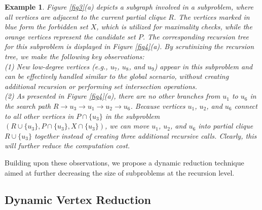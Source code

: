 \documentclass[sigconf, nonacm]{acmart}
\newtheorem{exmp}{Example}%
\begin{document}
\begin{exmp}
    \textit{
   Figure \ref{fig3}(a) depicts a subgraph involved in a subproblem, where all vertices are adjacent to the current partial clique $R$. The vertices marked in blue form the forbidden set $X$, which is utilized for maximality checks, while the orange vertices represent the candidate set $P$. The corresponding recursion tree for this subproblem is displayed in Figure \ref{fig4}(a).
    By scrutinizing the recursion tree, we make the following key observations: \\
    (1) New low-degree vertices (e.g., $u_7$, $u_8$, and $u_9$) appear in this subproblem and can be effectively handled similar to the global scenario, without %
    creating additional recursion or performing set intersection operations. \\
    (2) As presented in Figure \ref{fig4}(a), there are no other branches from $u_1$ to $u_6$ in the search path $R\rightarrow u_3\rightarrow u_1\rightarrow u_2\rightarrow u_6$. Because vertices $u_1$, $u_2$, and $u_6$ connect to all other vertices in $P\cap\{u_3\}$ in the subproblem $(R\cup \{u_3\},P\cap\{u_3\},X\cap\{u_3\})$, 
    we can move $u_1$, $u_2$, and $u_6$ into partial clique $R\cup\{u_3\}$ together instead of creating three additional recursive calls. Clearly, this will further reduce the computation cost. 
    }
\end{exmp}
 
Building upon these observations, we propose a dynamic reduction technique aimed at further decreasing the size of subproblems at the recursion level.



\subsection{Dynamic Vertex Reduction}
\end{document}
